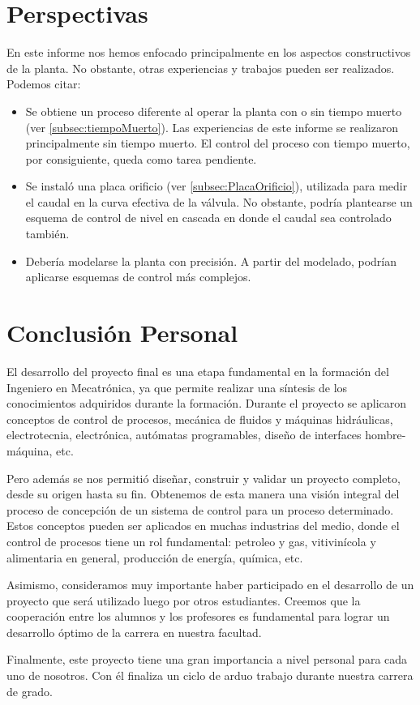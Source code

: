 \section{Perspectivas}
\label{sec:Perspectivas}
En este informe nos hemos enfocado principalmente en los aspectos constructivos
de la planta.
No obstante, otras experiencias y trabajos pueden ser realizados. Podemos citar:
\begin{itemize}
 \item Se obtiene un proceso diferente al operar la planta con o sin tiempo
muerto (ver \ref{subsec:tiempoMuerto}).
Las experiencias de este informe se realizaron principalmente sin tiempo
muerto.
El control del proceso con tiempo muerto, por consiguiente, queda como tarea
pendiente.
\item Se instaló una placa orificio (ver \ref{subsec:PlacaOrificio}), utilizada
para medir el caudal en la curva efectiva de la válvula.
No obstante, podría plantearse un esquema de control de nivel en cascada en
donde el caudal sea controlado también.
\item Debería modelarse la planta con precisión.
A partir del modelado, podrían aplicarse esquemas de control más
complejos.
\end{itemize}

\section{Conclusión Personal}
\label{sec:ConclusionPersonal}


El desarrollo del proyecto final es una etapa fundamental en la formación del
Ingeniero en Mecatrónica, ya que permite realizar una síntesis de los
conocimientos adquiridos durante la formación.
Durante el proyecto se aplicaron conceptos de control de
procesos, mecánica de fluidos y máquinas hidráulicas, electrotecnia,
electrónica, autómatas programables, diseño de interfaces hombre-máquina, etc.

Pero además se nos permitió diseñar, construir y validar un proyecto completo,
desde su origen hasta su fin.
Obtenemos de esta manera una visión integral del proceso de concepción de un
sistema de control para un proceso determinado.
Estos conceptos pueden ser aplicados en muchas industrias del medio, donde el
control de procesos tiene un rol fundamental: petroleo y gas, vitivinícola y
alimentaria en general, producción de energía, química, etc.

Asimismo, consideramos muy importante haber participado en el desarrollo de un
proyecto que será utilizado luego por otros estudiantes.
Creemos que la cooperación entre los alumnos y los profesores es fundamental
para lograr un desarrollo óptimo de la carrera en nuestra facultad.

Finalmente, este proyecto tiene una gran importancia a nivel personal para cada
uno de nosotros.
Con él finaliza un ciclo de arduo trabajo durante nuestra
carrera de grado.

